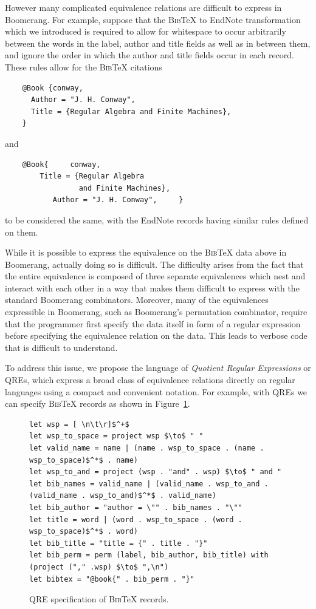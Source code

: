 \documentclass{svproc}
\newcommand{\bibtex}{\textsc{Bib}\TeX{}}
\begin{document}
However many complicated equivalence relations are difficult to express in
Boomerang. For example, suppose that the \bibtex{} to EndNote
transformation which we introduced is required to allow for whitespace to occur
arbitrarily between the words in the label, author and title fields as well as
in between them, and ignore the order in which the author and title fields
occur in each record.
These rules allow for the \bibtex{} citations
\begin{verbatim}
    @Book {conway,
      Author = "J. H. Conway",
      Title = {Regular Algebra and Finite Machines},
    }
\end{verbatim}
and
\begin{verbatim}
    @Book{     conway,
        Title = {Regular Algebra 
                 and Finite Machines},
           Author = "J. H. Conway",     }
\end{verbatim}
to be considered the same, with the EndNote records having similar rules
defined on them.

While it is possible to express the equivalence on the \bibtex{} data above in
Boomerang, actually doing so is difficult. The difficulty arises from the fact
that the entire equivalence is composed of three separate equivalences which
nest and interact with each other in a way that makes them difficult to express
with the standard Boomerang combinators. Moreover, many of the equivalences
expressible in Boomerang, such as Boomerang's permutation combinator, require
that the programmer first specify the data itself in form of a regular
expression before specifying the equivalence relation on the data. This leads to
verbose code that is difficult to understand.

To address this issue, we propose the language of {\em Quotient Regular
Expressions} or QREs, which express a broad class of equivalence relations
directly on regular languages using a compact and convenient notation. For
example, with QREs we can specify \bibtex{} records as shown in
Figure~\ref{fig:example-qre}.

\begin{figure}[t]
\begin{lstlisting}
let wsp = [ \n\t\r]$^+$
let wsp_to_space = project wsp $\to$ " "
let valid_name = name | (name . wsp_to_space . (name . wsp_to_space)$^*$ . name)
let wsp_to_and = project (wsp . "and" . wsp) $\to$ " and "
let bib_names = valid_name | (valid_name . wsp_to_and . (valid_name . wsp_to_and)$^*$ . valid_name)
let bib_author = "author = \"" . bib_names . "\""
let title = word | (word . wsp_to_space . (word . wsp_to_space)$^*$ . word)
let bib_title = "title = {" . title . "}"
let bib_perm = perm (label, bib_author, bib_title) with (project ("," .wsp) $\to$ ",\n")
let bibtex = "@book{" . bib_perm . "}"
\end{lstlisting}
\caption{QRE specification of \bibtex{} records. }
  \label{fig:example-qre}
\end{figure}
\end{document}
